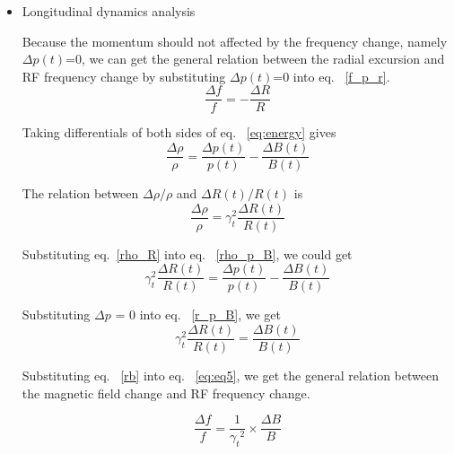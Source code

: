 \begin {itemize}
\item Longitudinal dynamics analysis

Because the momentum should not affected by the frequency change, namely $\Delta p(t)$=0, we can get the general relation between the radial excursion and RF frequency change by substituting $\Delta p(t)$=0 into eq. ~\ref {f_p_r}.
\begin{equation}
\frac{\Delta{f}}{f} = - \frac{\Delta{R}}{R}
\label{eq:eq4}
\end{equation}


Taking differentials of both sides of eq. ~\ref{eq:energy} gives
\begin{equation}
\frac{\Delta\rho}{\rho} = \frac{\Delta{p(t)}}{p(t)}-\frac{\Delta{B(t)}}{B(t)}\label{rho_p_B}
\end{equation}

The relation between $\Delta \rho/\rho$ and $\Delta R(t)/R(t)$ is
\begin{equation}
\frac{\Delta\rho}{\rho} = \gamma_t^2 \frac{\Delta{R(t)}}{R(t)} \label{rho_R}
\end{equation}

Substituting eq.~\ref{rho_R} into eq. ~\ref{rho_p_B}, we could get 
\begin{equation}
\gamma_t^2 \frac{\Delta R(t)}{R(t)} = \frac{\Delta p(t)}{p(t)}-\frac{\Delta{B(t)}}{B(t)}\label{r_p_B}
\end{equation}

Substituting $\Delta p$ = 0 into eq. ~\ref{r_p_B}, we get
\begin{equation}
\gamma_t^2 \frac{\Delta R(t)}{R(t)} = \frac{\Delta{B(t)}}{B(t)}\label{rb}
\end{equation}

Substituting eq. ~\ref{rb} into eq. ~\ref{eq:eq5}, we get the general relation between the magnetic field change and RF frequency change.

\begin{equation}
\frac{\Delta{f}}{f} =  \frac{1}{{\gamma_t}^2}\times{\frac{\Delta{B}}{B}}
\label{eq:eq5}
\end{equation}
\end {itemize}



